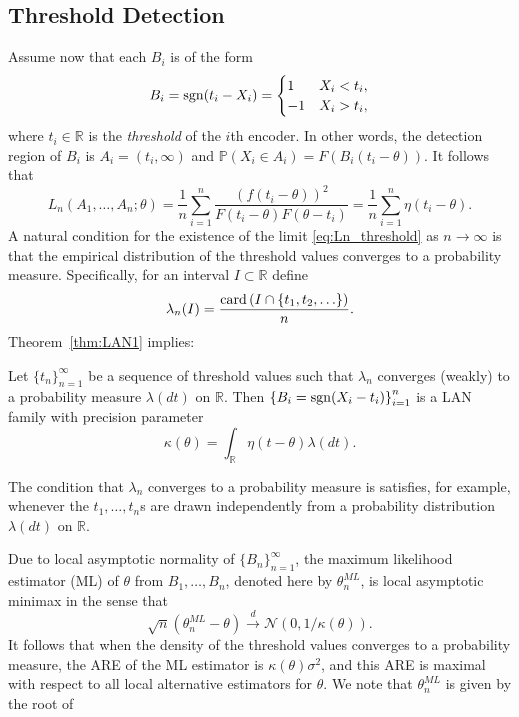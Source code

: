 \subsection{Threshold Detection \label{subsec:threshold}}
Assume now that each $B_i$ is of the form
\begin{equation}
\label{eq:threshold_message}
B_i = \mathrm{sgn}(t_i - X_i) = \begin{cases} 1 & X_i< t_i, \\
-1 & X_i > t_i,
\end{cases}  
\end{equation}
where $t_i\in\mathbb R$ is the \emph{threshold} of the $i$th encoder. In other words, the detection region of $B_i$ is $A_i = (t_i,\infty)$ and $\mathbb P(X_i \in A_i) = F \left( B_i(t_i-\theta) \right)$. It follows that
\begin{equation}
L_n(A_1,\ldots,A_n;\theta) = \frac{1}{n} \sum_{i=1}^n \frac{ \left(f(t_i-\theta) \right)^2 }{F\left(t_i-\theta \right) F\left(\theta - t_i \right) }  = \frac{1}{n} \sum_{i=1}^n \eta(t_i - \theta).
\label{eq:Ln_threshold}
\end{equation}
A natural condition for the existence of the limit \eqref{eq:Ln_threshold} as $n\to \infty$ is that the empirical distribution of the threshold values converges to a probability measure. Specifically, for an interval $I \subset \mathbb R$ define
\[
\lambda_n(I) = \frac{ \mathrm{card} \left( I \cap \{t_1,t_2,\ldots \} \right)}{n}. 
\]
Theorem~\ref{thm:LAN1} implies:
\begin{cor} \label{cor:LAN_thresh}
Let $\{t_n\}_{n=1}^\infty$ be a sequence of threshold values such that $\lambda_n$ converges (weakly) to a probability measure $\lambda(dt)$ on $\mathbb R$. Then $\left\{ B_i = \mathrm{sgn}(X_i - t_i) \right\}_{i=1}^n$ is a LAN family with precision parameter
\[
\kappa(\theta) = \int_{\mathbb R} \eta(t-\theta) \lambda(dt). 
\]
\end{cor}
The condition that $\lambda_n$ converges to a probability measure is satisfies, for example, whenever the $t_1,\ldots,t_n$s are drawn independently from a probability distribution $\lambda(dt)$ on $\mathbb R$. \par
Due to local asymptotic normality of $\{B_n\}_{n=1}^\infty$, the maximum likelihood estimator (ML) of $\theta$ from $B_1,\ldots,B_n$, denoted here by 
${\theta}^{ML}_n$, is local asymptotic minimax in the sense that 
\[
\sqrt{n} \left( {\theta}^{ML}_n - \theta \right) \overset{d}{\longrightarrow} \mathcal{N} \left(0, 1/\kappa(\theta) \right). 
\]
It follows that when the density of the threshold values converges to a probability measure, the ARE of the ML estimator is $\kappa(\theta)\sigma^2$, and this ARE is maximal with respect to all local alternative estimators for $\theta$. We note that ${\theta}^{ML}_n$ is given by the root of 
